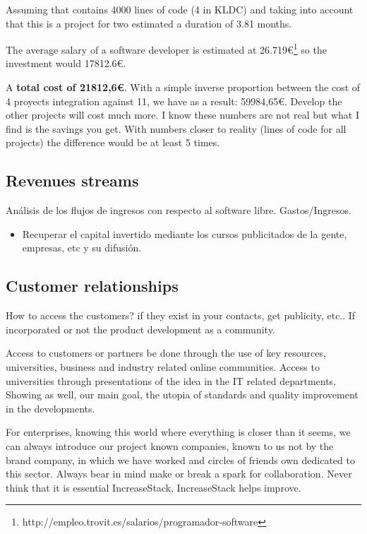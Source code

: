 \documentclass[11pt]{scrartcl}
\begin{document}
\par Assuming that contains 4000 lines of code (4 in KLDC) and taking into account that this is a project for two estimated a duration of 3.81 months.
\par The average salary of a software developer is estimated at 26.719\euro\footnote{http://empleo.trovit.es/salarios/programador-software} so the investment would 17812.6\euro.
    
\par A \textbf{total cost of 21812,6\euro}. With a simple inverse proportion between the cost of 4 proyects integration against 11, we have as a result: 59984,65\euro. Develop the other projects will cost much more. I know these numbers are not real but what I find is the savings you get. With numbers closer to reality (lines of code for all projects) the difference would be at least 5 times.

\subsection{Revenues streams}


\par Análisis de los flujos de ingresos con respecto al software libre. Gastos/Ingresos.
    \begin{itemize}
        \item Recuperar el capital invertido mediante los cursos publicitados de la gente, empresas, etc y su difusión.
    \end{itemize}

\subsection{Customer relationships}

\par How to access the customers? if they exist in your contacts, get publicity, etc.. If incorporated or not the product development as a community.

\par Access to customers or partners be done through the use of key resources, universities, business and industry related online communities.
Access to universities through presentations of the idea in the IT related departments. Showing as well, our main goal, the utopia of standards and quality improvement in the developments.

\par For enterprises, knowing this world where everything is closer than it seems, we can always introduce our project known companies, known to us not by the brand company, in which we have worked and circles of friends own dedicated to this sector. Always bear in mind make or break a spark for collaboration. Never think that it is essential IncreaseStack, IncreaseStack helps improve.
\end{document}
